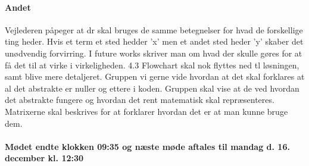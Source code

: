 \documentclass[article,11pt]{memoir}
\begin{document}
\paragraph{Andet}
Vejlederen påpeger at dr skal bruges de samme betegnelser for hvad de forskellige ting heder. Hvis et term et sted hedder 'x' men et andet sted heder 'y' skaber det unødvendig forvirring.
I future works skriver man om hvad der skulle gøres for at få det til at virke i virkeligheden.
4.3 Flowchart skal nok flyttes ned tl løsningen, samt blive mere detaljeret.
Gruppen vi gerne vide hvordan at det skal forklares at al det abstrakte er nuller og ettere i koden. Gruppen skal vise at de ved hvordan det abstrakte fungere og hvordan det rent matematisk skal repræsenteres. Matrixerne skal beskrives for at forklarer hvordan det er at man kunne bruge dem.\newline

\paragraph{Mødet endte klokken 09:35 og næste møde aftales til mandag d. 16. december kl. 12:30}
\end{document}
